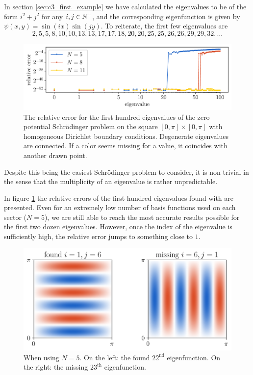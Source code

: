 In section \ref{sec:c3_first_example} we have calculated the eigenvalues to be of the form $i^2 + j^2$ for any $i, j \in \mathbb{N}^+$, and the corresponding eigenfunction is given by $ \psi(x, y) = \sin(ix)\sin(jy)$. To reiterate, the first few eigenvalues are
$$
  2, 5, 5, 8, 10, 10, 13, 13, 17, 17, 18, 20, 20, 25, 25, 26, 26, 29, 29, 32, \dots
$$

\begin{figure}
  \begin{center}
    \includegraphics[width=\textwidth]{img/chapter3/experiments/zero.pdf}
  \end{center}
  \caption{The relative error for the first hundred eigenvalues of the zero potential Schrödinger problem on the square $[0, \pi] \times [0, \pi]$ with homogeneous Dirichlet boundary conditions. Degenerate eigenvalues are connected. If a color seems missing for a value, it coincides with another drawn point.}\label{fig:c3_experiment_zero}
\end{figure}

Despite this being the easiest Schrödinger problem to consider, it is non-trivial in the sense that the multiplicity of an eigenvalue is rather unpredictable.

In figure \ref{fig:c3_experiment_zero} the relative errors of the first hundred eigenvalues found with \pyslisetd{} are presented. Even for an extremely low number of basis functions used on each sector ($N = 5$), we are still able to reach the most accurate results possible for the first two dozen eigenvalues. However, once the index of the eigenvalue is sufficiently high, the relative error jumps to something close to $1$.

\begin{figure}
  \begin{center}
    \includegraphics[width=\textwidth]{img/chapter3/experiments/zero_missing.png}
  \end{center}
  \caption{When using $N = 5$. On the left: the found $22^\text{nd}$ eigenfunction. On the right: the missing $23^\text{th}$ eigenfunction.}\label{fig:c3_experiment_zero_missing}
\end{figure}

